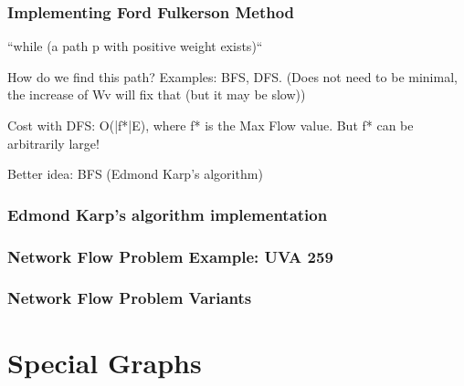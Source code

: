 \documentclass{beamer}
\begin{document}
\begin{frame}
  \frametitle{Implementing Ford Fulkerson Method}
``while (a path p with positive weight exists)``

How do we find this path? Examples: BFS, DFS.
(Does not need to be minimal, the increase of Wv will fix that (but it may be slow))

Cost with DFS: O(|f*|E), where f* is the Max Flow value. But f* can be arbitrarily large!

Better idea: BFS (Edmond Karp's algorithm)
\end{frame}

\begin{frame}
  \frametitle{Edmond Karp's algorithm implementation}

\end{frame}

\begin{frame}
  \frametitle{Network Flow Problem Example: UVA 259}
\end{frame}

\begin{frame}
  \frametitle{Network Flow Problem Variants}



\end{frame}



\section{Special Graphs}
\end{document}

